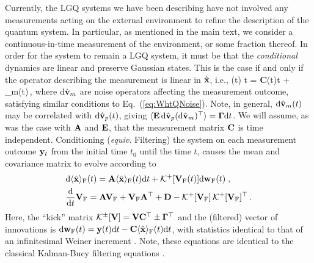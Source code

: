 \documentclass[./Main-revtex.tex]{subfiles}
\begin{document}
Currently, the LGQ systems we have been describing have not involved any measurements acting on the external environment to refine the description of the quantum system. In particular, as mentioned in the main text, we consider a continuous-in-time measurement of the environment, or some fraction thereof. %
In order for the system to remain a LGQ system, it must be that the {\em conditional} dynamics are linear and preserve Gaussian states. This is the case \cite{DohJac99} if and only if %
the operator describing the measurement is linear in $\hat{\bf x}$, i.e.,
\beq
{}(t) \dd t = {\bf C}\bx(t)\dd t + \dd{}_m(t)\,,
\eeq
where ${\rm d} \hat{\bf v}_m$ are noise operators affecting the measurement outcome, satisfying similar conditions to Eq.~(\ref{eq:WhtQNoise}). Note, in general, ${\rm d}\hat{\bf v}_m(t)$ may be correlated with ${\rm d}\hat{\bf v}_p(t)$, giving $\langle {\bf E}\,{\rm d}\hat{\bf v}_p({\rm d}\hat{\bf v}_m)^\top \rangle = {\bf \Gamma}{\rm d} t$. We will assume, as was the case with ${\bf A}$ and ${\bf E}$, that the measurement matrix ${\bf C}$ is time independent. Conditioning ({\em equiv.} Filtering) the system on each measurement outcome ${\bf y}_t$ from the initial time $t_0$ until the time $t$, causes the mean and covariance matrix to evolve according to \cite{DohJac99,wiseman2009quantum}
\begin{align}
    &{\rm d}\langle \hat{\bf x} \rangle_{\text F}(t) = {\bf A}\langle \hat{\bf x} \rangle_{\text F}(t){\rm d} t + {\cal K}^{+}[{\bf V}_{\text F}(t)]{\rm d} \mathbf{w}_{\text F}(t)\;,
\label{1stMomFiltering}\\
    &\dfrac{{\rm d}}{{\rm d} t}{\bf V}_{\text F} = \mathbf{A}\mathbf{V}_{\text F} + \mathbf{V}_{\text F}\mathbf{A}^\top + \mathbf{D} - \mathcal{K}^{+}[\mathbf{V}_{\text F}]\,\mathcal{K}^{+}[\mathbf{V}_{\text F}]^\top\,.
\label{2ndMomFiltering}
\end{align}
Here, the ``kick'' matrix ${\cal K}^{\pm}[{\bf V}] = {\bf V}{\bf C}^\top \pm {\bf \Gamma}^\top$ and the (filtered) vector of innovations is ${\rm d}{\bf w}_{\text F}(t) = {\bf y}(t){\rm d} t - {\bf C}\langle \hat{\bf x} \rangle_{\text F}(t){\rm d} t$, with statistics identical to that of an infinitesimal Weiner increment \cite{wiseman2009quantum}. Note, these equations are identical to the classical Kalman-Bucy filtering equations \cite{KalBuc61}. 
\end{document}
